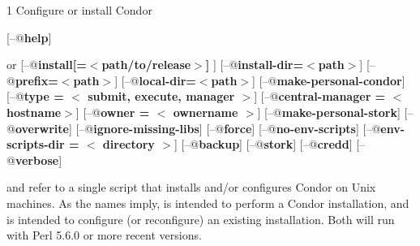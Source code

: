 \begin{ManPage}{\label{man-condor-configure}}{1}
{Configure or install Condor}

\Synopsis {}
[\verb@--@\textbf{help}]

 or 
[\verb@--@\textbf{install[=$<$path/to/release$>$] }]
[\verb@--@\textbf{install-dir=$<$path$>$}]
[\verb@--@\textbf{prefix=$<$path$>$}]
[\verb@--@\textbf{local-dir=$<$path$>$}]
[\verb@--@\textbf{make-personal-condor}]
[\verb@--@\textbf{type = $<$ submit, execute, manager $>$}]
[\verb@--@\textbf{central-manager = $<$ hostname$>$}]
[\verb@--@\textbf{owner = $<$ ownername $>$}]
[\verb@--@\textbf{make-personal-stork}]
[\verb@--@\textbf{overwrite}]
[\verb@--@\textbf{ignore-missing-libs}]
[\verb@--@\textbf{force}]
[\verb@--@\textbf{no-env-scripts}]
[\verb@--@\textbf{env-scripts-dir = $<$ directory $>$}]
[\verb@--@\textbf{backup}]
[\verb@--@\textbf{stork}]
[\verb@--@\textbf{credd}]
[\verb@--@\textbf{verbose}]






\Description 

 and  refer to a single script that installs
and/or configures Condor on Unix machines.  As the names imply,
 is intended to perform a Condor installation, and
 is intended to configure (or reconfigure) an
existing installation.
Both will run with Perl 5.6.0 or more recent versions.


\end{ManPage}
